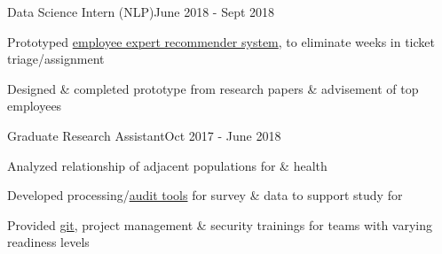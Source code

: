 \documentclass{article}
\newenvironment{**mylist}[2]{
  \subsubsection*{#1\hfill#2}
  \small
  \begin{list}{}{}
    \setlength{\topsep}{0pt}
   \setlength{\itemsep}{1pt}
   \setlength{\parskip}{0pt}
   \setlength{\parsep}{0pt}}{\end{list}\normalsize}
\newcommand{\LU}[1]{\hspace{-1em}{\bf Technologies : #1}}
\def\PT{{\bf(Part Time)}\xspace}
\def\grd{Graduate\xspace}
\begin{document}
\begin{comment}
\begin{**mylist}{\censor{\href{www.thinkful.com}{Thinkful}} \PT \tabb Data Science Technical Expert}{Jan 2019 - March 2019}
\item Provided safe environment for training \& instruction in a remote-first setting
\item Advised career transitioners in mastery of professional \& data science topics
\end{**mylist}
\end{comment}

\begin{**mylist}{ \tabb Data Science Intern (NLP)}{June 2018 - Sept 2018}
\item Prototyped \href{https://github.com/probinso/expert-modeling-system/}{employee expert recommender system}, to eliminate weeks in ticket triage/assignment
\item Designed \& completed prototype from research papers \& advisement of top  employees
\end{**mylist}


\begin{**mylist}{\href{https://www.ohsu.edu/school-of-medicine/developmental-cognition-and-neuroimaging-lab}{} \tabb \grd Research Assistant}{Oct 2017 - June 2018}
\item Analyzed relationship of adjacent  populations for  \&  health
\item Developed processing/\href{https://gitlab.com/Fair_lab/HCPVaTT}{audit tools} for survey \&  data to support \href{https://abcdstudy.org}{}  study for 
\item Provided \href{https://github.com/probinso/ABC}{git}, project management \& security trainings for teams with varying readiness levels
\end{**mylist}
\end{document}
